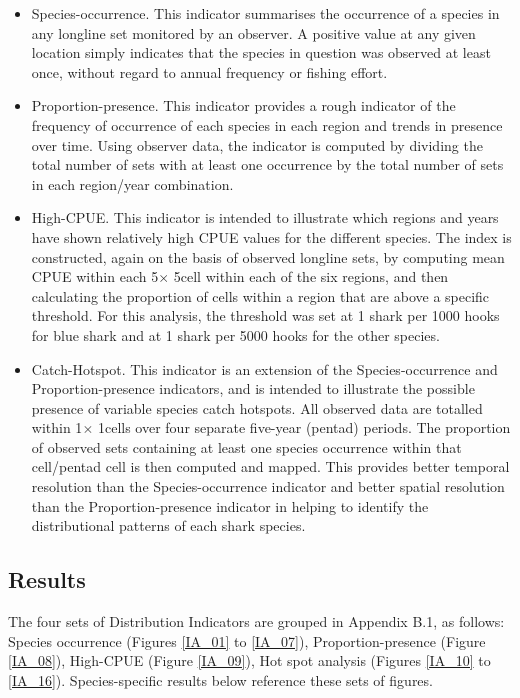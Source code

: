 \documentclass[12pt]{SCreport}
\begin{document}
\begin{itemize}
\item	Species-occurrence.  This indicator summarises the occurrence of a species in any longline set monitored by an observer.  A positive value at any given location simply indicates that the species in question was observed at least once, without regard to annual frequency or fishing effort.

\item	Proportion-presence.  This indicator provides a rough indicator of the frequency of occurrence of each species in each region and trends in presence over time.  Using observer data, the indicator is computed by dividing the total number of sets with at least one occurrence by the total number of sets in each region/year combination.
\item	High-CPUE.  This indicator is intended to illustrate which regions and years have shown relatively high CPUE values for the different species.  The index is constructed, again on the basis of observed longline sets, by computing mean CPUE within each 5\degree $\times$ 5\degree cell within each of the six regions, and then calculating the proportion of cells within a region that are above a specific threshold.  For this analysis, the threshold was set at 1 shark per 1000 hooks for blue shark and at 1 shark per 5000 hooks for the other species.
\item	Catch-Hotspot.  This indicator is an extension of the Species-occurrence and Proportion-presence indicators, and is intended to illustrate the possible presence of variable species catch hotspots.  All observed data are totalled within 1\degree $\times$ 1\degree cells over four separate five-year (pentad) periods.  The proportion of observed sets containing at least one species occurrence within that cell/pentad cell is then computed and mapped.  This provides better temporal resolution than the Species-occurrence indicator and better spatial resolution than the Proportion-presence indicator in helping to identify the distributional patterns of each shark species.
\end{itemize}



\subsection{Results}
The four sets of Distribution Indicators are grouped in Appendix B.1, as follows: Species occurrence (Figures \ref{IA_01} to \ref{IA_07}), Proportion-presence (Figure \ref{IA_08}), High-CPUE (Figure \ref{IA_09}), Hot spot analysis (Figures \ref{IA_10} to \ref{IA_16}).  Species-specific results below reference these sets of figures.
      
\end{document}
